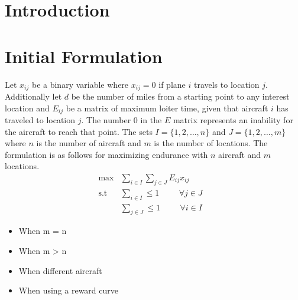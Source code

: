 \section{Introduction}

\section{Initial Formulation}
Let $x_{ij}$ be a binary variable where $x_{ij} = 0$ if plane $i$ travels to location $j$. Additionally let $d$ be the number of miles from a starting point to any interest location and $E_{ij}$ be a matrix of maximum loiter time, given that aircraft $i$ has traveled to location $j$. The number $0$ in the $E$ matrix represents an inability for the aircraft to reach that point. The sets $I = \{1,2,\dots,n\}$ and $J = \{1,2,\dots,m\}$ where $n$ is the number of aircraft and $m$ is the number of locations. The formulation is as follows for maximizing endurance with $n$ aircraft and $m$ locations.
\begin{equation}
    \begin{aligned}
        \max &\sum_{i\in I}\sum_{j\in J} E_{ij}x_{ij}\hspace{1cm}\\
        \text{s.t } &\sum_{i\in I} \leq 1\hspace{1cm} \forall j\in J\\
        &\sum_{j\in J} \leq 1\hspace{1cm} \forall i \in I
    \end{aligned}
\end{equation}
\begin{itemize}
    \item When m = n
    \item When m > n
    \item When different aircraft
    \item When using a reward curve
\end{itemize}

